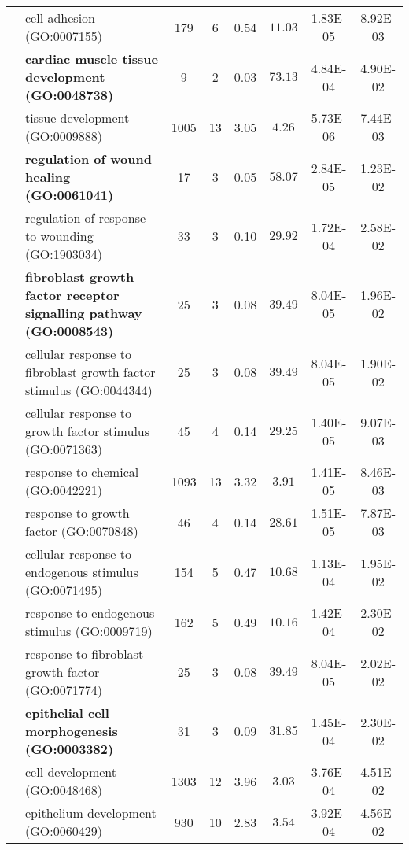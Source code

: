 \begin{table}[!b]
\begin{center}
\begin{tabular}{clS[table-format=4.0]S[table-format=2.0]S[table-format=2.2]ccc}
 & cell adhesion (GO:0007155) & 179 & 6 & 0.54 & $11.03$ & 1.83E-05 & 8.92E-03 \\[1.5ex]
 & \textbf{cardiac muscle tissue development (GO:0048738)} & 9 & 2 & 0.03 & $73.13$ & 4.84E-04 & 4.90E-02 \\
 & tissue development (GO:0009888) & 1005 & 13 & 3.05 & $4.26$ & 5.73E-06 & 7.44E-03 \\[1.5ex]
 & \textbf{regulation of wound healing (GO:0061041)} & 17 & 3 & 0.05 & $58.07$ & 2.84E-05 & 1.23E-02 \\
 & regulation of response to wounding (GO:1903034) & 33 & 3 & 0.10 & $29.92$ & 1.72E-04 & 2.58E-02 \\[1.5ex]
 & \textbf{fibroblast growth factor receptor signalling pathway (GO:0008543)} & 25 & 3 & 0.08 & $39.49$ & 8.04E-05 & 1.96E-02 \\
 & cellular response to fibroblast growth factor stimulus (GO:0044344) & 25 & 3 & 0.08 & $39.49$ & 8.04E-05 & 1.90E-02 \\
 & cellular response to growth factor stimulus (GO:0071363) & 45 & 4 & 0.14 & $29.25$ & 1.40E-05 & 9.07E-03 \\
 & response to chemical (GO:0042221) & 1093 & 13 & 3.32 & $3.91$ & 1.41E-05 & 8.46E-03 \\
 & response to growth factor (GO:0070848) & 46 & 4 & 0.14 & $28.61$ & 1.51E-05 & 7.87E-03 \\
 & cellular response to endogenous stimulus (GO:0071495) & 154 & 5 & 0.47 & $10.68$ & 1.13E-04 & 1.95E-02 \\
 & response to endogenous stimulus (GO:0009719) & 162 & 5 & 0.49 & $10.16$ & 1.42E-04 & 2.30E-02 \\
 & response to fibroblast growth factor (GO:0071774) & 25 & 3 & 0.08 & $39.49$ & 8.04E-05 & 2.02E-02 \\[1.5ex]
 & \textbf{epithelial cell morphogenesis (GO:0003382)} & 31 & 3 & 0.09 & $31.85$ & 1.45E-04 & 2.30E-02 \\
 & cell development (GO:0048468) & 1303 & 12 & 3.96 & $3.03$ & 3.76E-04 & 4.51E-02 \\
 & epithelium development (GO:0060429) & 930 & 10 & 2.83 & $3.54$ & 3.92E-04 & 4.56E-02 \\
 \bottomrule
 \end{tabular}
\end{center}
\end{table}
\FloatBarrier
 \newpage
